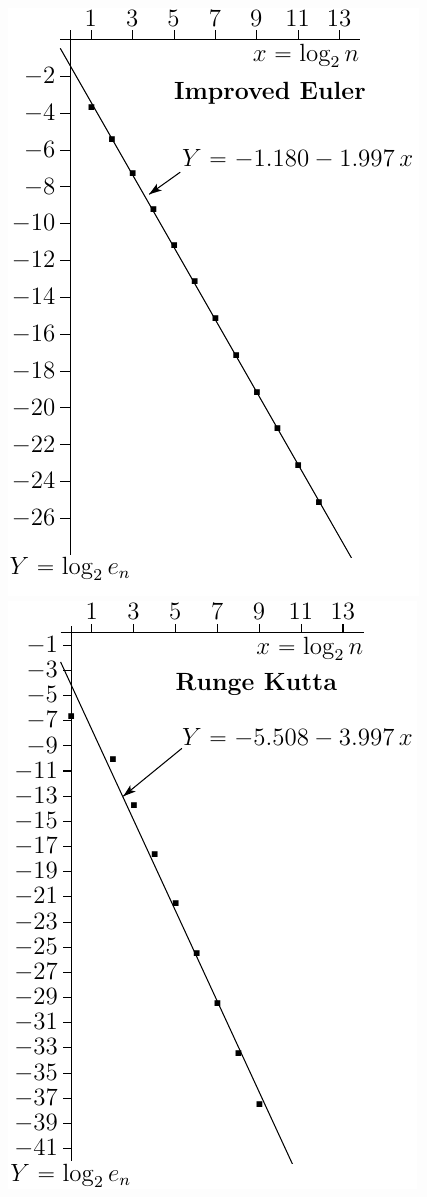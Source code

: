 \begin{wfig}
\begin{center}
    \includegraphics[scale=0.95]{imp_euler_error.pdf}\hskip0.5in
    \includegraphics[scale=0.95]{runge_kutta_error.pdf}
\end{center}
\end{wfig}

